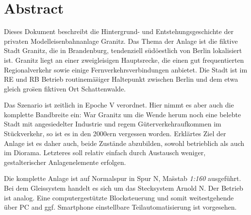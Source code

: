 \section*{Abstract}
\label{sec:abstract}

Dieses Dokument beschreibt die Hintergrund- und Entstehungsgeschichte der privaten Modelleisenbahnanlage Granitz.
Das Thema der Anlage ist die fiktive Stadt Granitz, die in Brandenburg, tendenziell s\"ud\"oestlich von Berlin lokalisiert ist.
Granitz liegt an einer zweigleisigen Hauptsrecke, die einen gut frequentierten Regionalverkehr sowie einige Fernverkehrsverbindungen anbietet.
Die Stadt ist im RE und RB Betrieb routinem\"a\"siger Haltepunkt zwischen Berlin und dem etwa gleich gro\"sen fiktiven Ort Schattenwalde.

Das Szenario ist zeitlich in Epoche V verordnet.
Hier nimmt es aber auch die komplette Bandbreite ein:
War Granitz um die Wende herum noch eine belebte Stadt mit angesiedelter Industrie und regem G\"uterverkehraufkommen im St\"uckverkehr, so ist es in den 2000ern vergessen worden.
Erkl\"artes Ziel der Anlage ist es daher auch, beide Zust\"ande abzubilden, sowohl betrieblich als auch im Diorama.
Letzteres soll relativ einfach durch Austausch weniger, gestalterischer Anlagenelemente erfolgen.

Die komplette Anlage ist auf Normalspur in Spur N, Ma\"sstab \textit{1:160} ausgef\"uhrt.
Bei dem Gleissystem handelt es sich um das Stecksystem Arnold N.
Der Betrieb ist analog.
Eine computergest\"utzte Blocksteuerung und somit weitestgehende \"uber PC and ggf. Smartphone einstellbare Teilautomatisierung ist vorgesehen.